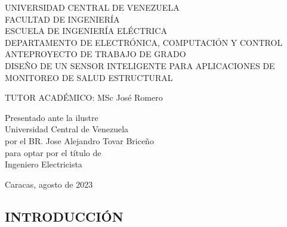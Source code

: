 \documentclass[12pt,letterpaper]{article}
\author{} %
\date{FECHA} %
\begin{document}
\renewcommand{\listfigurename}{Lista de Figuras}
\renewcommand{\listtablename}{Lista de Tablas}
\renewcommand{\contentsname}{Lista de Contenidos}
\renewcommand{\figurename}{Figura}
\renewcommand{\tablename}{Tabla}


\begin{center}

	\vspace{3cm} UNIVERSIDAD CENTRAL DE VENEZUELA \\
	FACULTAD DE INGENIERÍA \\
	ESCUELA DE INGENIERÍA ELÉCTRICA \\
	DEPARTAMENTO DE ELECTRÓNICA, COMPUTACIÓN Y CONTROL\\
	ANTEPROYECTO DE TRABAJO DE GRADO \\

	\vspace{7cm} DISEÑO DE UN SENSOR INTELIGENTE PARA APLICACIONES DE MONITOREO DE SALUD ESTRUCTURAL
\end{center}


\vspace{6cm}

\begin{flushleft}
	TUTOR ACADÉMICO: MSc José Romero \\
\end{flushleft}


\begin{flushright}

	Presentado ante la ilustre\\
	Universidad Central de Venezuela\\
	por el BR. Jose Alejandro Tovar Briceño \\
	para optar por el título de \\
	Ingeniero Electricista   \\

\end{flushright}

\begin{center}
	Caracas, agosto de 2023
\end{center}


\vspace{2cm}
\thispagestyle{empty}
\newpage


\begin{center}
	\section*{ INTRODUCCIÓN}
\end{center}
\end{document}
